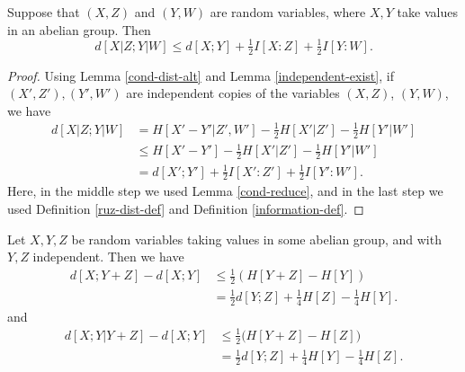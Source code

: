 \begin{lemma}\label{cond-dist-fact}
  Suppose that $(X, Z)$ and $(Y, W)$ are random variables, where $X, Y$ take values in an abelian group. Then
  \[    d[X  | Z;Y | W] \leq d[X; Y] + \tfrac{1}{2} I[X : Z] + \tfrac{1}{2} I[Y : W].\]
\end{lemma}

\begin{proof}
Using Lemma \ref{cond-dist-alt} and Lemma \ref{independent-exist}, if $(X',Z'), (Y',W')$ are independent copies of the variables $(X,Z)$, $(Y,W)$, we have
\begin{align*}
  d[X  | Z; Y | W]&= H[X'-Y'|Z',W'] - \tfrac{1}{2} H[X'|Z'] - \tfrac{1}{2}H[Y'|W'] \\
                       &\le H[X'-Y']- \tfrac{1}{2} H[X'|Z'] - \tfrac{1}{2}H[Y'|W'] \\
                       &= d[X';Y'] + \tfrac{1}{2} I[X' : Z'] + \tfrac{1}{2} I[Y' : W'].
\end{align*}
Here, in the middle step we used Lemma \ref{cond-reduce}, and in the last step we used Definition \ref{ruz-dist-def} and Definition \ref{information-def}.
\end{proof}

\begin{lemma}\label{first-useful}
  Let $X, Y, Z$ be random variables taking values in some abelian group, and with $Y, Z$ independent. Then we have
  \begin{align}\nonumber d[X; Y + Z] -d[X; Y] &  \leq \tfrac{1}{2} (H[Y+Z] - H[Y]) \\ & = \tfrac{1}{2} d[Y; Z] + \tfrac{1}{4} H[Z] - \tfrac{1}{4} H[Y]. \label{lem51-a} \end{align}
  and
  \begin{align}\nonumber
  d[X;Y|Y+Z] - d[X;Y] & \leq \tfrac{1}{2} \bigl(H[Y+Z] - H[Z]\bigr) \\ & = \tfrac{1}{2} d[Y;Z] + \tfrac{1}{4} H[Y] - \tfrac{1}{4} H[Z].
    \label{ruzsa-3}
  \end{align}
  \end{lemma}

